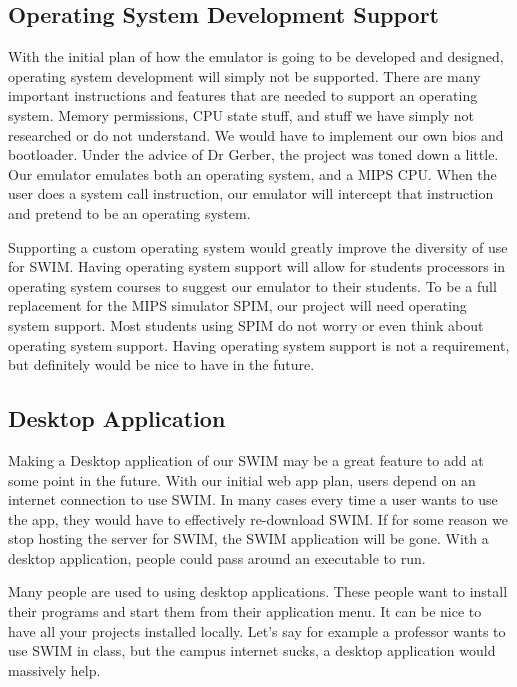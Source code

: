 \documentclass[
    parskip=half,
    fontsize=12pt,
    titlepage=firstiscover,
    toc=bibliography,
    numbers=endperiod
]{scrartcl}
\begin{document}
\subsection{Operating System Development Support}

With the initial plan of how the emulator is going to be developed and
designed, operating system development will simply not be supported.
There are many important instructions and features that are needed to
support an operating system. Memory permissions, CPU state stuff, and
stuff we have simply not researched or do not understand. We would have
to implement our own bios and bootloader. Under the advice of Dr Gerber,
the project was toned down a little. Our emulator emulates both an
operating system, and a MIPS CPU. When the user does a system call
instruction, our emulator will intercept that instruction and pretend to
be an operating system.

Supporting a custom operating system would greatly improve the diversity
of use for SWIM. Having operating system support will allow for students
processors in operating system courses to suggest our emulator to their
students. To be a full replacement for the MIPS simulator SPIM, our
project will need operating system support. Most students using SPIM do
not worry or even think about operating system support. Having operating
system support is not a requirement, but definitely would be nice to
have in the future.


\subsection{Desktop Application}

Making a Desktop application of our SWIM may be a great feature to add
at some point in the future. With our initial web app plan, users depend
on an internet connection to use SWIM. In many cases every time a user
wants to use the app, they would have to effectively re-download SWIM.
If for some reason we stop hosting the server for SWIM, the SWIM
application will be gone. With a desktop application, people could pass
around an executable to run.

Many people are used to using desktop applications. These people want to
install their programs and start them from their application menu. It
can be nice to have all your projects installed locally. Let's say for
example a professor wants to use SWIM in class, but the campus internet
sucks, a desktop application would massively help.
\end{document}
